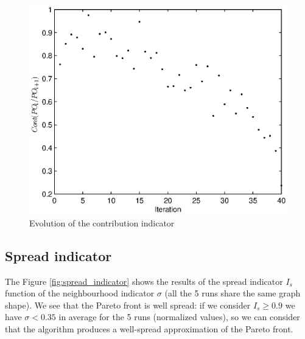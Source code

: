 \begin{figure}[h!]
\begin{center}
\includegraphics[width=1\linewidth]{contrib2new.eps}
\end{center}
\vspace{-0.5cm}
\caption{Evolution of the contribution indicator}
\label{fig:contrib}
\end{figure}

\subsection{Spread indicator}
\label{app:spread}

The Figure \ref{fig:spread_indicator} shows the results of the spread indicator $I_s$ function of the neighbourhood indicator $\sigma$ (all the 5 runs share the same graph shape). We see that the Pareto front is well spread: if  we consider $I_s \geq 0.9$ we have $\sigma < 0.35$ in average for the 5 runs (normalized values), so we can consider that the algorithm produces a well-spread approximation of the Pareto front.

